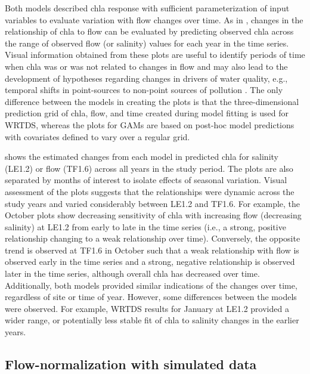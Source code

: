 \documentclass[letterpaper,12pt,oneside]{article}\usepackage[]{graphicx}\usepackage[]{color}
\begin{document}
Both models described \ac{chla} response with sufficient parameterization of input variables to evaluate variation with flow changes over time.  As in \citet{Beck15}, changes in the relationship of \ac{chla} to flow can be evaluated by predicting observed \ac{chla} across the range of observed flow (or salinity) values for each year in the time series.  Visual information obtained from these plots are useful to identify periods of time when \ac{chla} was or was not related to changes in flow and may also lead to the development of hypotheses regarding changes in drivers of water quality, e.g., temporal shifts in point-sources to non-point sources of pollution \citep{Hirsch10,Beck15}.  The only difference between the models in creating the plots is that the three-dimensional prediction grid of \ac{chla}, flow, and time created during model fitting is used for \ac{WRTDS}, whereas the plots for \acp{GAM} are based on post-hoc model predictions with covariates defined to vary over a regular grid. 

 shows the estimated changes from each model in predicted \ac{chla} for salinity (LE1.2) or flow (TF1.6) across all years in the study period.  The plots are also separated by months of interest to isolate effects of seasonal variation.  Visual assessment of the plots suggests that the relationships were dynamic across the study years and varied considerably between LE1.2 and TF1.6.  For example, the October plots show decreasing sensitivity of \ac{chla} with increasing flow (decreasing salinity) at LE1.2 from early to late in the time series (i.e., a strong, positive relationship changing to a weak relationship over time).  Conversely, the opposite trend is observed at TF1.6 in October such that a weak relationship with flow is observed early in the time series and a strong, negative relationship is observed later in the time series, although overall \ac{chla} has decreased over time.  Additionally, both models provided similar indications of the changes over time, regardless of site or time of year.  However, some differences between the models were observed.  For example, \ac{WRTDS} results for January at LE1.2 provided a wider range, or potentially less stable fit of \ac{chla} to salinity changes in the earlier years.

\subsection*{Flow-normalization with simulated data}
\end{document}
